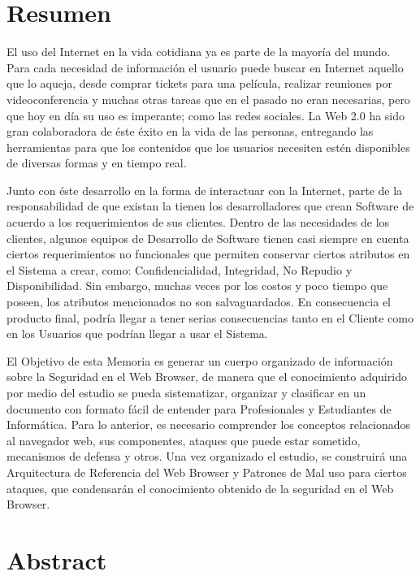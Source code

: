 
\section*{Resumen}
\label{chap:resumen}

El uso del Internet en la vida cotidiana ya es parte de la mayoría del mundo. Para cada necesidad de información el usuario puede buscar en Internet aquello que lo aqueja, desde comprar tickets para una película, realizar reuniones por videoconferencia y muchas otras tareas que en el pasado no eran necesarias, pero que hoy en día su uso es imperante; como las redes sociales. La Web 2.0 ha sido gran colaboradora de éste éxito en la vida de las personas, entregando las herramientas para que los contenidos que los usuarios necesiten estén disponibles de diversas formas y en tiempo real.

Junto con éste desarrollo en la forma de interactuar con la Internet, parte de la responsabilidad de que existan la tienen los desarrolladores que crean Software de acuerdo a los requerimientos de sus clientes. Dentro de las necesidades de los clientes, algunos equipos de Desarrollo de Software tienen casi siempre en cuenta ciertos requerimientos no funcionales que permiten conservar ciertos atributos en el Sistema a crear, como: Confidencialidad, Integridad, No Repudio y Disponibilidad. Sin embargo, muchas veces por los costos y poco tiempo que poseen, los atributos mencionados no son salvaguardados. En consecuencia el producto final, podría llegar a tener serias consecuencias tanto en el Cliente como en los Usuarios que podrían llegar a usar el Sistema.

El Objetivo de esta Memoria es generar un cuerpo organizado de información sobre la Seguridad en el Web Browser, de manera que el conocimiento adquirido por medio del estudio se pueda sistematizar, organizar y clasificar en un documento con formato fácil de entender para Profesionales y Estudiantes de Informática. Para lo anterior, es necesario comprender los conceptos relacionados al navegador web, sus componentes, ataques que puede estar sometido, mecanismos de defensa y otros. Una vez organizado el estudio, se construirá una Arquitectura de Referencia del Web Browser y Patrones de Mal uso para ciertos ataques, que condensarán el conocimiento obtenido de la seguridad en el Web Browser. 


\section*{Abstract}
\label{chap:abstract}

